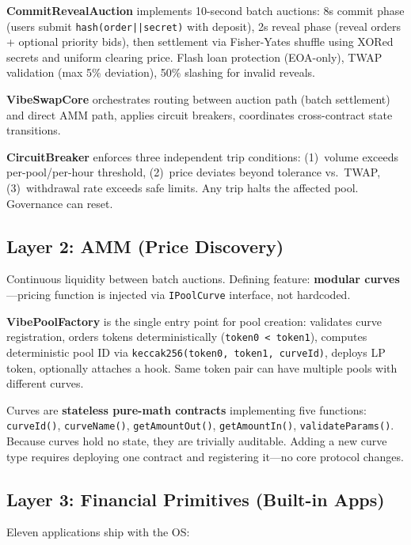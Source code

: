 \documentclass[9pt, letterpaper]{article}
\begin{document}
\textbf{CommitRevealAuction} implements 10-second batch auctions: 8s commit phase (users submit \texttt{hash(order||secret)} with deposit), 2s reveal phase (reveal orders + optional priority bids), then settlement via Fisher-Yates shuffle using XORed secrets and uniform clearing price. Flash loan protection (EOA-only), TWAP validation (max 5\% deviation), 50\% slashing for invalid reveals.

\textbf{VibeSwapCore} orchestrates routing between auction path (batch settlement) and direct AMM path, applies circuit breakers, coordinates cross-contract state transitions.

\textbf{CircuitBreaker} enforces three independent trip conditions: (1)~volume exceeds per-pool/per-hour threshold, (2)~price deviates beyond tolerance vs.\ TWAP, (3)~withdrawal rate exceeds safe limits. Any trip halts the affected pool. Governance can reset.

\subsection{Layer 2: AMM (Price Discovery)}

Continuous liquidity between batch auctions. Defining feature: \textbf{modular curves}---pricing function is injected via \texttt{IPoolCurve} interface, not hardcoded.

\textbf{VibePoolFactory} is the single entry point for pool creation: validates curve registration, orders tokens deterministically (\texttt{token0 < token1}), computes deterministic pool ID via \texttt{keccak256(token0, token1, curveId)}, deploys LP token, optionally attaches a hook. Same token pair can have multiple pools with different curves.

Curves are \textbf{stateless pure-math contracts} implementing five functions: \texttt{curveId()}, \texttt{curveName()}, \texttt{getAmountOut()}, \texttt{getAmountIn()}, \texttt{validateParams()}. Because curves hold no state, they are trivially auditable. Adding a new curve type requires deploying one contract and registering it---no core protocol changes.

\subsection{Layer 3: Financial Primitives (Built-in Apps)}

Eleven applications ship with the OS:
\end{document}

